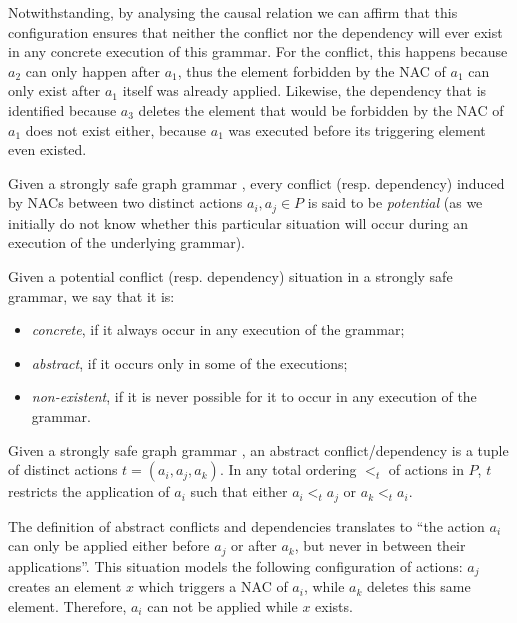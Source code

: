 \begin{example}
Notwithstanding, by analysing the causal relation we can affirm that this configuration ensures that neither the conflict nor the dependency will ever exist in any concrete execution of this grammar. For the conflict, this happens because $a_2$ can only happen after $a_1$, thus the element forbidden by the NAC of $a_1$ can only exist after $a_1$ itself was already applied. Likewise, the dependency that is identified because $a_3$ deletes the element that would be forbidden by the NAC of $a_1$
  does not exist either, because $a_1$ was executed before its triggering element even existed.
\end{example}

\begin{definition}\label{def:conflict-dependency-characterization} Given a strongly safe graph grammar \doublyTypedGraphGrammarCore{}, every conflict (resp. dependency) induced by NACs between two distinct actions $a_i, a_j \in P$ is said to be \emph{potential} (as we initially do not know whether this particular situation will occur during an execution of the underlying grammar). %

    Given a potential conflict (resp. dependency) situation in a strongly safe grammar, we say that it is:
    \begin{itemize}
      \item \emph{concrete}, if it always occur in any execution of the grammar;
      \item \emph{abstract}, if it occurs only in some of the executions;
      \item \emph{non-existent}, if it is never possible for it to occur in any execution of the grammar.
    \end{itemize}
\end{definition}

\begin{definition} Given a strongly safe graph grammar \doublyTypedGraphGrammarCore{}, an abstract conflict/dependency is a tuple of distinct actions $t = (a_i,a_j,a_k)$. In any total ordering $<_t$ of actions in $P$, $t$ restricts the application of $a_i$ such that either $a_i <_t a_j$ or $a_k <_t a_i$.

\hfill
\end{definition}

The definition of abstract conflicts and dependencies translates to ``the action $a_i$ can only be applied either before $a_j$ or after $a_k$, but never in between their applications''. This situation models the following configuration of actions: $a_j$ creates an element $x$ which triggers a NAC of $a_i$, while $a_k$ deletes this same element. Therefore, $a_i$ can not be applied while $x$ exists.

